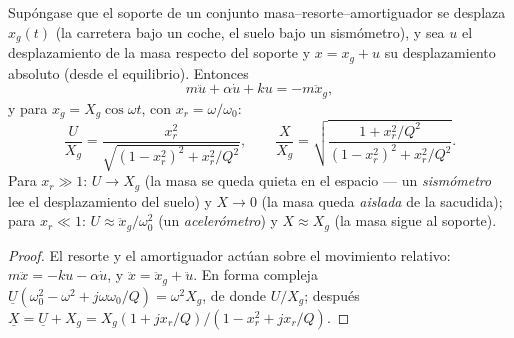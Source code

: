 \begin{proposition}\label{prop:b1:oscillators-resonance:base}
Supóngase que el soporte de un conjunto masa--resorte--amortiguador se
desplaza $x_g(t)$ (la carretera bajo un coche, el suelo bajo un
sismómetro), y sea $u$ el desplazamiento de la masa respecto del soporte y
$x = x_g + u$ su desplazamiento absoluto (desde el equilibrio). Entonces
\[
m\ddot u + \alpha\dot u + ku = -m\ddot x_g ,
\]
y para $x_g = X_g\cos\omega t$, con $x_r = \omega/\omega_0$:
\[
\frac{U}{X_g} = \frac{x_r^2}{\sqrt{(1 - x_r^2)^2 + x_r^2/Q^2}},
\qquad
\frac{X}{X_g} = \sqrt{\frac{1 + x_r^2/Q^2}{(1 - x_r^2)^2 + x_r^2/Q^2}} .
\]
Para $x_r \gg 1$: $U \to X_g$ (la masa se queda quieta en el espacio ---
un \emph{sismómetro} lee el desplazamiento del suelo) y $X \to 0$ (la masa
queda \emph{aislada} de la sacudida); para $x_r \ll 1$: $U \approx
\ddot x_g/\omega_0^2$ (un \emph{acelerómetro}) y $X \approx X_g$ (la masa
sigue al soporte).
\end{proposition}

\begin{proof}
El resorte y el amortiguador actúan sobre el movimiento relativo:
$m\ddot x = -ku -
\alpha\dot u$, y $\ddot x = \ddot x_g + \ddot u$. En forma compleja
$\underline U(\omega_0^2 - \omega^2 + j\omega\omega_0/Q) = \omega^2X_g$, de donde
$U/X_g$; después $\underline X = \underline U + X_g = X_g(1 + jx_r/Q)/(1 -
x_r^2 + jx_r/Q)$.
\end{proof}

